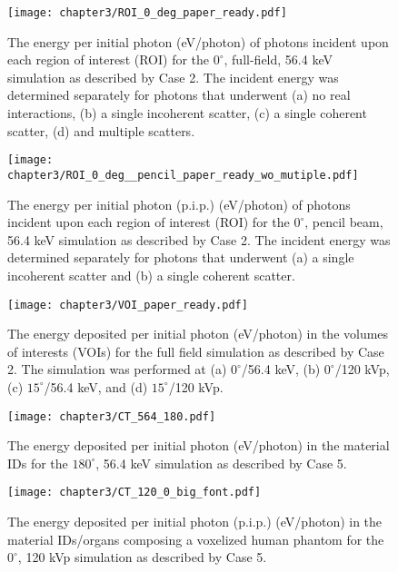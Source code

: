 \begin{figure}[H]
    \centering
	\texttt{[image: chapter3/ROI\_0\_deg\_paper\_ready.pdf]}
	\caption{The energy per initial photon (eV/photon) of photons incident upon each region of interest (ROI) for the $0^\circ$, full-field, 56.4 keV simulation as described by Case 2. The incident energy was determined separately for photons that underwent (a) no real interactions, (b) a single incoherent scatter, (c) a single coherent scatter, (d) and multiple scatters.}
	\label{fig:ROIFFGraph}
\end{figure}

\begin{figure}[H]
    \centering
	\texttt{[image: chapter3/ROI\_0\_deg\_\_pencil\_paper\_ready\_wo\_mutiple.pdf]}
	\caption{The energy per initial photon (p.i.p.) (eV/photon) of photons incident upon each region of interest (ROI) for the $0^\circ$, pencil beam, 56.4 keV simulation as described by Case 2. The incident energy was determined separately for photons that underwent (a) a single incoherent scatter and (b) a single coherent scatter.}
	\label{fig:ROIPGraph}
\end{figure}

\begin{figure}[H]
    \centering
	\texttt{[image: chapter3/VOI\_paper\_ready.pdf]}
	\caption{The energy deposited per initial photon (eV/photon) in the volumes of interests (VOIs) for the full field simulation as described by Case 2. The simulation was performed at (a) $0^\circ$/56.4 keV, (b) $0^\circ$/120 kVp, (c) $15^\circ$/56.4 keV, and (d) $15^\circ$/120 kVp.}
	\label{fig:VOIFFGraph}
\end{figure}

\begin{figure}[H]
    \centering
	\texttt{[image: chapter3/CT\_564\_180.pdf]}
	\caption{The energy deposited per initial photon (eV/photon) in the material IDs for the $180^\circ$, 56.4 keV simulation as described by Case 5.}
	\label{fig:CTGraph}
\end{figure}

\begin{figure}[H]
    \centering
	\texttt{[image: chapter3/CT\_120\_0\_big\_font.pdf]}
	\caption{The energy deposited per initial photon (p.i.p.) (eV/photon) in the material IDs/organs composing a voxelized human phantom for the $0^\circ$, 120 kVp simulation as described by Case 5.}
	\label{fig:CTGraph}
\end{figure}

